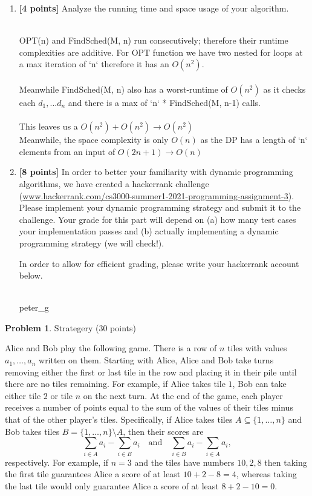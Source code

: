 \documentclass[11pt]{article}
\theoremstyle{definition}
\theoremstyle{theorem}
\newtheorem{prob}{Problem}
\newcommand{\solution}{\medskip\noindent{\color{DarkBlue}\textbf{Solution:}}}
\begin{document}
\begin{enumerate}[label=(\alph*)]
\item  \textbf{[4 points]} Analyze the running time and space usage of your algorithm.

\solution \\ 

OPT(n) and FindSched(M, n) run consecutively; therefore their runtime complexities are additive. For OPT function we have two nested for loops at a max iteration of `n` therefore it has an $O(n^2)$. \\\\
Meanwhile FindSched(M, n) also has a worst-runtime of $O(n^2)$ as it checks each $d_1,...d_n$ and there is a max of `n` * FindSched(M, n-1) calls. \\
\\
This leaves us a $O(n^2) + O(n^2) \rightarrow O(n^2)$
\\
Meanwhile, the space complexity is only $O(n)$ as the DP has a length of `n` elements from an input of $O(2n + 1) \rightarrow O(n)$
\item \textbf{[8 points]} In order to better your familiarity with dynamic programming algorithms, we have created a hackerrank challenge (\href{www.hackerrank.com/cs3000-summer1-2021-programming-assignment-3}{www.hackerrank.com/cs3000-summer1-2021-programming-assignment-3}). Please implement your dynamic programming strategy and submit it to the challenge. Your grade for this part will depend on (a) how many test cases your implementation passes and (b) actually implementing a dynamic programming strategy (we will check!).

In order to allow for efficient grading, please write your hackerrank account below.

\solution \\
peter\_g

\end{enumerate}




\newpage
\begin{prob}Strategery (30 points)\end{prob}

Alice and Bob play the following game.  There is a row of $n$ tiles with values $a_1,\dots,a_n$ written on them.  Starting with Alice, Alice and Bob take turns removing either the first or last tile in the row and placing it in their pile until there are no tiles remaining.  For example, if Alice takes tile $1$, Bob can take either tile $2$ or tile $n$ on the next turn.  At the end of the game, each player receives a number of points equal to the sum of the values of their tiles minus that of the other player's tiles.  Specifically, if Alice takes tiles $A \subseteq \{1,\dots,n\}$ and Bob takes tiles $B = \{1,\dots,n\} \setminus A$, then their scores are
$$
\sum_{i \in A} a_i - \sum_{i \in B} a_i \quad \textrm{and} \quad \sum_{i \in B} a_i - \sum_{i \in A} a_i,
$$
respectively.  For example, if $n = 3$ and the tiles have numbers $10, 2, 8$ then taking the first tile guarantees Alice a score of at least $10 + 2 - 8 = 4$, whereas taking the last tile would only guarantee Alice a score of at least $8 + 2 - 10 = 0$.
\end{document}
